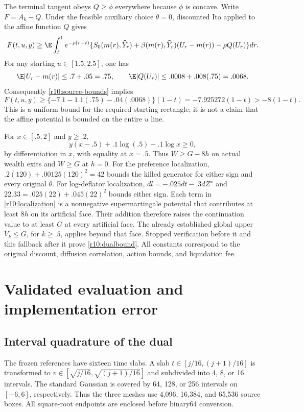 The terminal tangent obeys $Q\geq\phi$ everywhere because $\phi$ is concave. Write $F=A_k-Q$. Under the feasible auxiliary choice $\theta=0$, discounted Ito applied to the affine function $Q$ gives
\[
 F(t,u,y)\geq\E\int_t^1 e^{-\rho(r-t)}
 \{S_0(m(r),\widehat Y_r)+\beta(m(r),\widehat Y_r)(U_r-m(r))-\rho Q(U_r)\}dr.
\]
For any starting $u\in[1.5,2.5]$, one has
\[
 \E|U_r-m(r)|\leq.7+.05=.75,\qquad
 \E|Q(U_r)|\leq.0008+.008(.75)=.0068.
\]
Consequently \eqref{r10:source-bounds} implies
\begin{equation}
 F(t,u,y)\geq\{-7.1-1.1(.75)-.04(.0068)\}(1-t)
                 =-7.925272(1-t)>-8(1-t).\label{r10:boundaryfloor}
\end{equation}
This is a uniform bound for the required starting rectangle; it is not a claim that the affine potential is bounded on the entire $u$ line.

For $x\in[.5,2]$ and $y\geq.2$,
\[
 y(x-.5)+.1\log(.5)-.1\log x\geq0,
\]
by differentiation in $x$, with equality at $x=.5$. Thus $W\geq G-8h$ on actual wealth exits and $W\geq G$ at $h=0$. For the preference localization, $.2(120)+.00125(120)^2=42$ bounds the killed generator for either sign and every original $\theta$. For log-deflator localization, $dl=-.025dt-.3dZ^x$ and
$22.33=.025(22)+.045(22)^2$ bounds either sign. Each term in \eqref{r10:localization} is a nonnegative supermartingale potential that contributes at least $8h$ on its artificial face. Their addition therefore raises the continuation value to at least $G$ at every artificial face. The already established global upper $V_k\leq G$, for $k\geq.5$, applies beyond that face. Stopped verification before it and this fallback after it prove \eqref{r10:dualbound}. All constants correspond to the original discount, diffusion correlation, action bounds, and liquidation fee.

\section{Validated evaluation and implementation error}\label{r10:proof:numerics}
\subsection{Interval quadrature of the dual}
The frozen references have sixteen time slabs. A slab $t\in[j/16,(j+1)/16]$ is transformed to $v\in[\sqrt{j/16},\sqrt{(j+1)/16}]$ and subdivided into 4, 8, or 16 intervals. The standard Gaussian is covered by 64, 128, or 256 intervals on $[-6,6]$, respectively. Thus the three meshes use 4,096, 16,384, and 65,536 source boxes. All square-root endpoints are enclosed before binary64 conversion.

